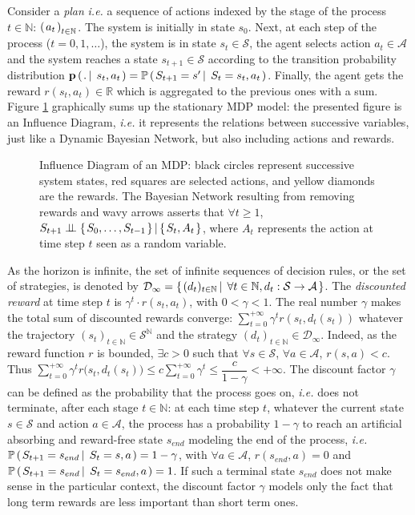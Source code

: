Consider a \textit{plan} \textit{i.e.} a sequence of actions 
indexed by the stage of the process $t\in \mathbb{N}$: 
$\left( \left. a_t \right. \right)_{t \in \mathbb{N}}$.
The system is initially in state $s_0$. 
Next, at each step of the process ($t=0,1,\ldots$), 
the system is in state $s_t \in \mathcal{S}$, 
the agent selects action $a_t \in \mathcal{A}$ 
and the system reaches a state $s_{t+1} \in \mathcal{S}$ 
according to the transition probability distribution
$\textbf{p} \left( \left.  . \, \right| \left. \, s_t , a_t \right. \right) 
= \mathbb{P} \left( \left.  S_{t+1} = s' \, \right| \left. \, S_t=s_t, a_t  \right. \right)$.
Finally, the agent gets the reward $r(s_{t},a_t) \in \mathbb{R}$ 
which is aggregated to the previous ones
with a sum.
Figure \ref{fig_mdp} graphically sums up 
the stationary MDP model: 
the presented figure is an Influence Diagram,
\textit{i.e.} it represents the relations between successive variables,
just like a Dynamic Bayesian Network, but also including actions and rewards.
\begin{figure}

\caption[Influence Diagram of an MDP]{
Influence Diagram of an MDP:
black circles represent successive system states,
red squares are selected actions,
and yellow diamonds are the rewards.
The Bayesian Network resulting from removing rewards and wavy arrows 
asserts that $\forall t \geqslant 1$, 
$S_{t+1} \perp\!\!\!\perp \left\{ \left.  S_{0}, \ldots, S_{t-1}  \right. \right\} \vert \left\{ \left. S_t,A_t \right. \right\}$,
where $A_t$ represents the action at time step $t$ seen as a random variable.
}
\label{fig_mdp}
\end{figure}

As the horizon is infinite,
the set of infinite sequences of decision rules,
or the set of strategies, 
is denoted by
$\mathcal{D}_{\infty} = \left\{ \left.  (d_t)_{t \in \mathbb{N}} 
\, \right| \left. \, \forall t \in \mathbb{N}, d_t: \mathcal{S} \rightarrow \mathcal{A}  \right. \right\}$.
The \textit{discounted reward} at time step $t$
is $\gamma^{t} \cdot r(s_t,a_t)$, with $0<\gamma<1$.
The real number $\gamma$ makes the total sum of discounted rewards converge:
$\displaystyle \sum_{t=0}^{+ \infty} \gamma^t r(s_t,d_t(s_t)) $
whatever the trajectory $(s_t)_{t \in \mathbb{N}} \in \mathcal{S}^{\mathbb{N}}$
and the strategy $(d_t)_{t \in \mathbb{N}} \in \mathcal{D}_{\infty}$.
Indeed, as the reward function $r$ is bounded, 
$\exists c>0$ such that $\forall s \in \mathcal{S}$, $\forall a \in \mathcal{A}$, $r(s,a)<c$.
Thus $\displaystyle \sum_{t=0}^{+ \infty} \gamma^t r\Big(s_t,d_t(s_t)\Big) \leqslant c \sum_{t=0}^{+\infty} \gamma^t \leqslant \dfrac{c}{1-\gamma}  < + \infty$.
The discount factor $\gamma$ can be defined as the probability 
that the process goes on, \textit{i.e.} does not terminate, 
after each stage $t \in \mathbb{N}$: 
at each time step $t$, whatever the current state $s \in \mathcal{S}$
and action $a \in \mathcal{A}$, 
the process has a probability $1 - \gamma$
to reach an artificial absorbing and reward-free state $s_{end}$ 
modeling the end of the process,
\textit{i.e.} $\mathbb{P} \left( \left.  S_{t+1} = s_{end} \, \right| \left. \, S_t = s, a   \right. \right) = 1 - \gamma$,
with $\forall a \in \mathcal{A}$,
$r(s_{end},a)=0$ and $\mathbb{P} \left( \left.  S_{t+1} = s_{end} \, \right| \left. \, S_t = s_{end}, a  \right. \right) = 1$.
If such a terminal state $s_{end}$ does not make sense in the particular context,
the discount factor $\gamma$ models only the fact that
long term rewards are less important than short term ones. 

